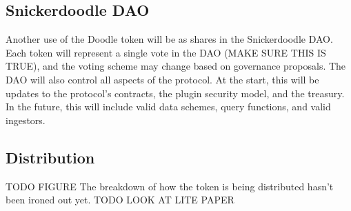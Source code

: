 \subsection{Snickerdoodle DAO}
\label{section:TokenDAO}
Another use of the Doodle token will be as shares in the Snickerdoodle DAO. Each token will represent a single vote in the DAO (MAKE SURE THIS IS TRUE), and the voting scheme may change based on governance proposals. The DAO will also control all aspects of the protocol. At the start, this will be updates to the protocol's contracts, the plugin security model, and the treasury. In the future, this will include valid data schemes, query functions, and valid ingestors. 

\subsection{Distribution}
TODO FIGURE
The breakdown of how the token is being distributed hasn't been ironed out yet. TODO LOOK AT LITE PAPER